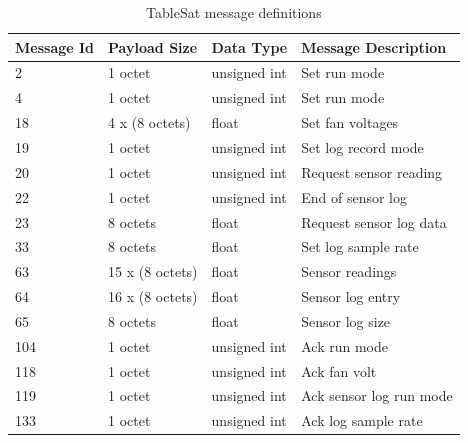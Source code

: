 \begin{table}[H]
  \centering
  \begin{tabular}{|l|l|l|l|}
    \hline
    Message Id & Payload Size & Data Type & Message Description \\ \hline
    2 & 1 octet & unsigned int & Set run mode \\ \hline
    4 & 1 octet & unsigned int & Set run mode \\ \hline
    18 & 4 x (8 octets) & float & Set fan voltages \\ \hline
    19 & 1 octet & unsigned int & Set log record mode \\ \hline
    20 & 1 octet & unsigned int & Request sensor reading \\ \hline
    22 & 1 octet & unsigned int & End of sensor log \\ \hline
    23 & 8 octets & float & Request sensor log data \\ \hline
    33 & 8 octets & float & Set log sample rate \\ \hline
    63 & 15 x (8 octets) & float & Sensor readings \\ \hline
    64 & 16 x (8 octets) & float & Sensor log entry \\ \hline
    65 & 8 octets & float & Sensor log size \\ \hline
    104 & 1 octet & unsigned int & Ack run mode \\ \hline
    118 & 1 octet & unsigned int & Ack fan volt \\ \hline
    119 & 1 octet & unsigned int & Ack sensor log run mode \\ \hline
    133 & 1 octet & unsigned int & Ack log sample rate \\ \hline
  \end{tabular}
  \caption{TableSat message definitions}
  \label{tbl:UDPMessageDefinitions}
\end{table}
